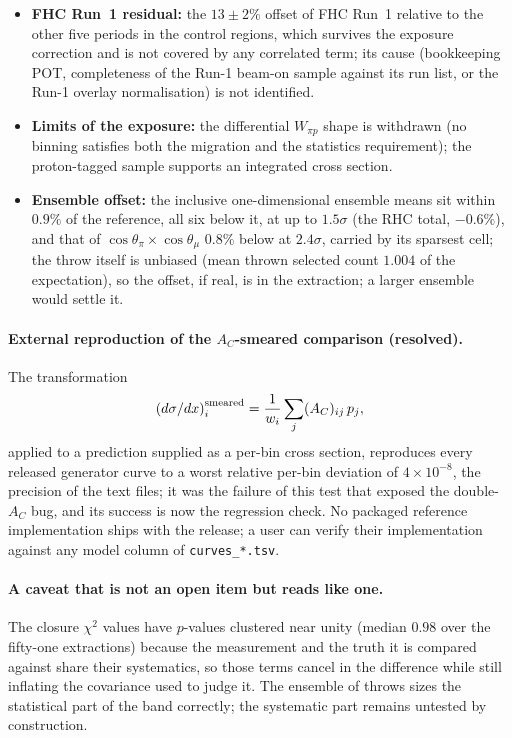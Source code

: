 \begin{itemize}
    $p_\mu$ bins of the control-region events agree with the data shape within $4\%$, and every shape test of
    the frozen protocol passes. Maps derived on half of the events describe the other half within $6\%$, close to
    the statistical expectation, and maps derived on one beam mode or production describe the other within the
    spread of the maps from period groups alone (control-sample note).
  \item \textbf{FHC Run~1 residual:} the $13\pm2\%$ offset of FHC Run~1 relative to the other five
    periods in the control regions, which survives the exposure correction and is not covered by any
    correlated term; its cause (bookkeeping POT, completeness of the Run-1 beam-on sample against its
    run list, or the Run-1 overlay normalisation) is not identified.
  \item \textbf{Limits of the exposure:} the differential $W_{\pi p}$ shape is withdrawn
    (no binning satisfies both the migration and the statistics requirement); the
    proton-tagged sample supports an integrated cross section.
  \item \textbf{Ensemble offset:} the inclusive one-dimensional ensemble means sit within $0.9\%$ of the
    reference, all six below it, at up to $1.5\sigma$ (the RHC total, $-0.6\%$), and that of
    $\cos\theta_\pi\times\cos\theta_\mu$ $0.8\%$ below at $2.4\sigma$, carried by its sparsest cell; the throw itself is
    unbiased (mean thrown selected count $1.004$ of the expectation), so the offset, if real, is in the
    extraction; a larger ensemble would settle it.
\end{itemize}

\paragraph{External reproduction of the $A_C$-smeared comparison (resolved).}
The transformation
\[
  \left(d\sigma/dx\right)^{\rm smeared}_i = \frac{1}{w_i}\sum_j (A_C)_{ij}\,p_j ,
\]
applied to a prediction supplied as a per-bin cross section, reproduces every released
generator curve to a worst relative per-bin deviation of $4\times10^{-8}$, the precision of the
text files; it was the failure of
this test that exposed the double-$A_C$ bug, and its success is now the regression check.
No packaged reference implementation ships with the release; a user can verify their
implementation against any model column of \texttt{curves\_*.tsv}.

\paragraph{A caveat that is not an open item but reads like one.}
The closure $\chi^2$ values have $p$-values clustered near unity (median $0.98$ over the
fifty-one extractions) because the measurement and the truth it is compared against share
their systematics, so those terms cancel in the difference while still inflating the
covariance used to judge it. The ensemble of throws sizes the statistical part of the
band correctly; the systematic part remains untested by construction.

